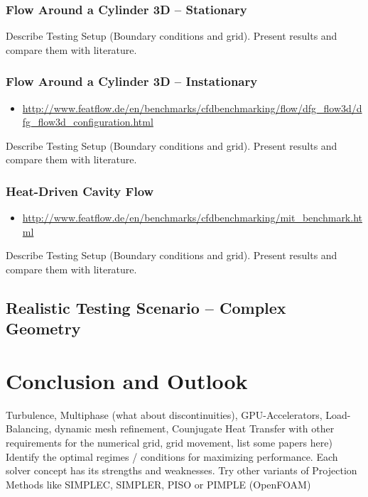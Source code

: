 \documentclass[article,type=msc,colorback,accentcolor=tud2a]{tudthesis}
\begin{document}
      \subsubsection{Flow Around a Cylinder 3D -- Stationary}
        Describe Testing Setup (Boundary conditions and grid). Present results and compare them with literature.
      \subsubsection{Flow Around a Cylinder 3D -- Instationary}
        \begin{itemize}
          \item\url{http://www.featflow.de/en/benchmarks/cfdbenchmarking/flow/dfg_flow3d/dfg_flow3d_configuration.html}
        \end{itemize}
        Describe Testing Setup (Boundary conditions and grid). Present results and compare them with literature.

      \subsubsection{Heat-Driven Cavity Flow}
        \begin{itemize}
          \item \url{http://www.featflow.de/en/benchmarks/cfdbenchmarking/mit_benchmark.html}
        \end{itemize}
        Describe Testing Setup (Boundary conditions and grid). Present results and compare them with literature.
    \subsection{Realistic Testing Scenario -- Complex Geometry}
        
  \section{Conclusion and Outlook}
    Turbulence, Multiphase (what about discontinuities), GPU-Accelerators, Load-Balancing, dynamic mesh refinement, Counjugate Heat Transfer with other requirements for the numerical grid, grid movement, list some papers here)
    Identify the optimal regimes / conditions for maximizing performance. Each solver concept has its strengths and weaknesses.
    Try other variants of Projection Methods like SIMPLEC, SIMPLER, PISO or PIMPLE (OpenFOAM)
\end{document}
